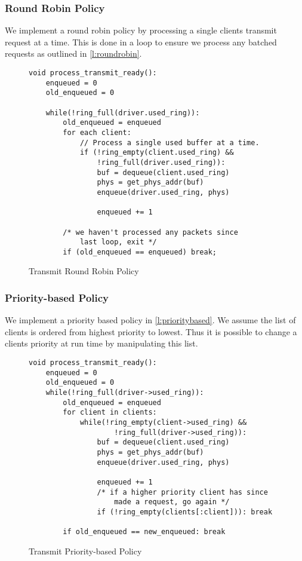\subsubsection{Round Robin Policy}
We implement a round robin policy by processing a single clients transmit request at a time.
This is done in a loop to ensure we process any batched requests as outlined in \autoref{l:roundrobin}.

\begin{figure} [H]
    \begin{verbatim}
void process_transmit_ready():
    enqueued = 0
    old_enqueued = 0

    while(!ring_full(driver.used_ring)):
        old_enqueued = enqueued
        for each client:
            // Process a single used buffer at a time. 
            if (!ring_empty(client.used_ring) &&
                !ring_full(driver.used_ring)):
                buf = dequeue(client.used_ring)
                phys = get_phys_addr(buf)
                enqueue(driver.used_ring, phys)

                enqueued += 1
            
        /* we haven't processed any packets since 
            last loop, exit */
        if (old_enqueued == enqueued) break;
\end{verbatim}
\caption{Transmit Round Robin Policy}
\label{l:roundrobin}
\end{figure}

\subsubsection{Priority-based Policy}

We implement a priority based policy in \autoref{l:prioritybased}. We assume the list of
clients is ordered from highest priority to lowest. Thus it is possible to change a clients
priority at run time by manipulating this list.\\

\begin{figure} [H]
    \begin{verbatim}
void process_transmit_ready():
    enqueued = 0
    old_enqueued = 0
    while(!ring_full(driver->used_ring)):
        old_enqueued = enqueued
        for client in clients:
            while(!ring_empty(client->used_ring) &&
                    !ring_full(driver->used_ring)):
                buf = dequeue(client.used_ring)
                phys = get_phys_addr(buf)
                enqueue(driver.used_ring, phys)

                enqueued += 1
                /* if a higher priority client has since 
                    made a request, go again */
                if (!ring_empty(clients[:client])): break

        if old_enqueued == new_enqueued: break
\end{verbatim}
\caption{Transmit Priority-based Policy}
\label{l:prioritybased}
\end{figure}

